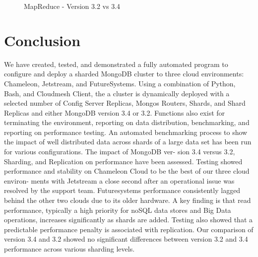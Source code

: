 \documentclass[sigconf]{acmart}
\begin{document}
\begin{figure}[htbp]
\centering
{}
\caption{MapReduce - Version 3.2 vs 3.4}
\label{fig:version-mapreduce}
\end{figure}

\section{Conclusion}

We have created, tested, and demonstrated a fully automated program to
configure and deploy a sharded MongoDB cluster to three cloud
environments: Chameleon, Jetstream, and FutureSystems. Using a
combination of Python, Bash, and Cloudmesh Client, the a cluster is
dynamically deployed with a selected number of Config Server Replicas,
Mongos Routers, Shards, and Shard Replicas and either MongoDB version
3.4 or 3.2. Functions also exist for terminating the environment,
reporting on data distribution, benchmarking, and reporting on
performance testing.  An automated benchmarking process to show the
impact of well distributed data across shards of a large data set has
been run for various configurations. The impact of MongoDB ver- sion
3.4 versus 3.2, Sharding, and Replication on performance have been
assessed. Testing showed performance and stability on Chameleon Cloud
to be the best of our three cloud environ- ments with Jetstream a
close second after an operational issue was resolved by the support
team. Futuresystems performance consistently lagged behind the other
two clouds due to its older hardware. A key finding is that read
performance, typically a high priority for noSQL data stores and Big
Data operations, increases significantly as shards are added. Testing
also showed that a predictable performance penalty is associated with
replication. Our comparison of version 3.4 and 3.2 showed no
significant differences between version 3.2 and 3.4 performance across
various sharding levels.




 
\end{document}
